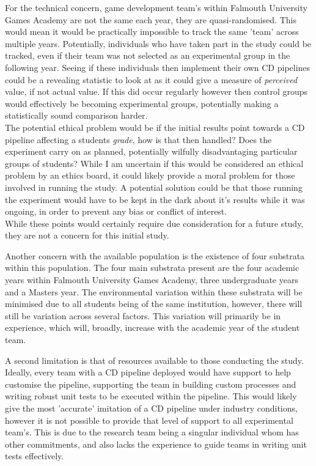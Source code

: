 \documentclass[lettersize,journal]{IEEEtran}
\begin{document}
        For the technical concern, game development team's within Falmouth University Games Academy are not the same each year, they are quasi-randomised. This would mean it would be practically impossible to track the same 'team' across multiple years. Potentially, individuals who have taken part in the study could be tracked, even if their team was not selected as an experimental group in the following year. Seeing if these individuals then implement their own CD pipelines could be a revealing statistic to look at as it could give a measure of \textit{perceived} value, if not actual value. If this did occur regularly however then control groups would effectively be becoming experimental groups, potentially making a statistically sound comparison harder. \\
        The potential ethical problem would be if the initial results point towards a CD pipeline affecting a students \textit{grade}, how is that then handled? Does the experiment carry on as planned, potentially wilfully disadvantaging particular groups of students? While I am uncertain if this would be considered an ethical problem by an ethics board, it could likely provide a moral problem for those involved in running the study. A potential solution could be that those running the experiment would have to be kept in the dark about it's results while it was ongoing, in order to prevent any bias or conflict of interest. \\
        While these points would certainly require due consideration for a future study, they are not a concern for this initial study.
        
        Another concern with the available population is the existence of four substrata within this population. The four main substrata present are the four academic years within Falmouth University Games Academy, three undergraduate years and a Masters year. The environmental variation within these substrata will be minimised due to all students being of the same institution, however, there will still be variation across several factors. This variation will primarily be in experience, which will, broadly, increase with the academic year of the student team.

        A second limitation is that of resources available to those conducting the study. Ideally, every team with a CD pipeline deployed would have support to help customise the pipeline, supporting the team in building custom processes and writing robust unit tests to be executed within the pipeline. This would likely give the most 'accurate' imitation of a CD pipeline under industry conditions, however it is not possible to provide that level of support to all experimental team's. This is due to the research team being a singular individual whom has other commitments, and also lacks the experience to guide teams in writing unit tests effectively.
\end{document}
